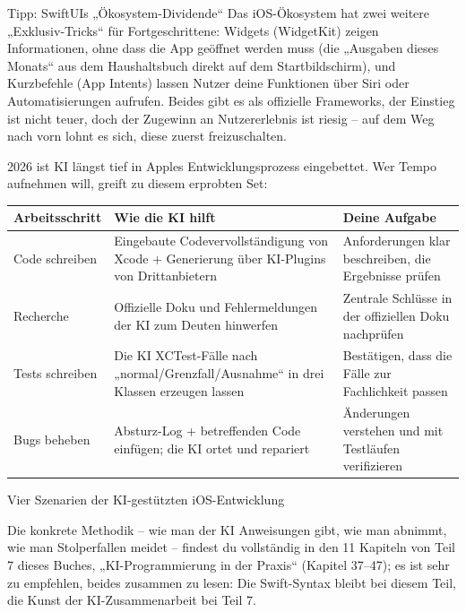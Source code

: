 \begin{tcbinfo}{Tipp: SwiftUIs „Ökosystem-Dividende“}
Das iOS-Ökosystem hat zwei weitere „Exklusiv-Tricks“ für Fortgeschrittene: Widgets (WidgetKit) zeigen Informationen, ohne dass die App geöffnet werden muss (die „Ausgaben dieses Monats“ aus dem Haushaltsbuch direkt auf dem Startbildschirm), und Kurzbefehle (App Intents) lassen Nutzer deine Funktionen über Siri oder Automatisierungen aufrufen. Beides gibt es als offizielle Frameworks, der Einstieg ist nicht teuer, doch der Zugewinn an Nutzererlebnis ist riesig – auf dem Weg nach vorn lohnt es sich, diese zuerst freizuschalten.

\end{tcbinfo}


2026 ist KI längst tief in Apples Entwicklungsprozess eingebettet. Wer Tempo aufnehmen will, greift zu diesem erprobten Set:

\begin{center}
\begin{tabularx}{\linewidth}{|X|X|X|}
\hline
\textbf{Arbeitsschritt} & \textbf{Wie die KI hilft} & \textbf{Deine Aufgabe} \tabularnewline
\hline
Code schreiben & Eingebaute Codevervollständigung von Xcode + Generierung über KI-Plugins von Drittanbietern & Anforderungen klar beschreiben, die Ergebnisse prüfen \tabularnewline
Recherche & Offizielle Doku und Fehlermeldungen der KI zum Deuten hinwerfen & Zentrale Schlüsse in der offiziellen Doku nachprüfen \tabularnewline
Tests schreiben & Die KI XCTest-Fälle nach „normal/Grenzfall/Ausnahme“ in drei Klassen erzeugen lassen & Bestätigen, dass die Fälle zur Fachlichkeit passen \tabularnewline
Bugs beheben & Absturz-Log + betreffenden Code einfügen; die KI ortet und repariert & Änderungen verstehen und mit Testläufen verifizieren \tabularnewline
\hline
\end{tabularx}
\end{center}

\begin{center}\small\color{gray}Vier Szenarien der KI-gestützten iOS-Entwicklung\end{center}

Die konkrete Methodik – wie man der KI Anweisungen gibt, wie man abnimmt, wie man Stolperfallen meidet – findest du vollständig in den 11 Kapiteln von Teil 7 dieses Buches, „KI-Programmierung in der Praxis“ (Kapitel 37–47); es ist sehr zu empfehlen, beides zusammen zu lesen: Die Swift-Syntax bleibt bei diesem Teil, die Kunst der KI-Zusammenarbeit bei Teil 7.

